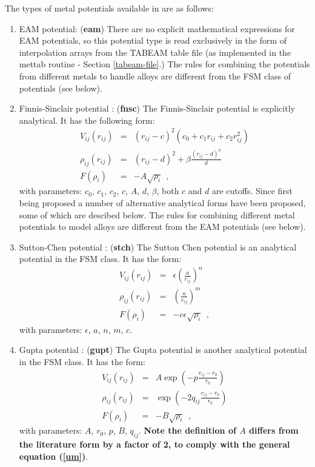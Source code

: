 The types of metal potentials available in \D{} are as follows:
\begin{enumerate}
\item EAM potential:  ({\bf eam})
There 
are no explicit mathematical expressions for EAM potentials, so
this potential type is read exclusively in the form of interpolation
arrays from the TABEAM table file (as implemented in the {\sc
mettab} routine - Section \ref{tabeam-file}.)  The rules
for combining the potentials from different metals to handle alloys
are different from the FSM class of potentials (see below).
\item Finnis-Sinclair potential \cite{finnis-84a}:  ({\bf fnsc})
The Finnis-Sinclair 
potential is explicitly analytical.  It has the 
following form:
\begin{eqnarray}
V_{ij}(r_{ij}) &=& (r_{ij}-c)^{2} (c_{0}+c_{1}r_{ij}+c_{2}r_{ij}^{2}) \nonumber \\
\rho_{ij}(r_{ij}) &=& (r_{ij}-d)^{2} + \beta \frac{(r_{ij}-d)^{3}}{d} \\
F(\rho_{i}) &=& -A \sqrt{\rho_{i}}~~, \nonumber
\end{eqnarray}
with parameters: $c_{0}$, $c_{1}$, $c_{2}$, $c$, $A$, $d$, $\beta$,
both $c$ and $d$ are cutoffs.  Since first being proposed a number of
alternative analytical forms have been proposed, some of which are
descibed below.  The rules for combining different metal potentials to
model alloys are different from the EAM potentials (see below).
\item Sutton-Chen potential \cite{sutton-90a,rafii-tabar-91a,todd-93a}:
({\bf stch})
The Sutton Chen 
potential is an analytical potential in the FSM
class.  It has the form:
\begin{eqnarray}
V_{ij}(r_{ij}) &=& \epsilon \left( \frac{a}{r_{ij}} \right)^{n} \nonumber \\
\rho_{ij}(r_{ij}) &=& \left( \frac{a}{r_{ij}} \right)^{m} \\
F(\rho_{i}) &=& -c \epsilon \sqrt{\rho_{i}}~~, \nonumber
\end{eqnarray}
with parameters: $\epsilon$, $a$, $n$, $m$, $c$. 
\item Gupta potential \cite{cleri-93a}:  ({\bf gupt})
The Gupta potential 
is another analytical potential in the FSM
class.  It has the form:
\begin{eqnarray}
V_{ij}(r_{ij}) &=& A \exp \left(-p \frac{r_{ij}-r_{0}}{r_{0}}\right) \nonumber \\
\rho_{ij}(r_{ij}) &=& \exp \left(-2 q_{ij} \frac{r_{ij}-r_{0}}{r_{0}}\right) \\
F(\rho_{i}) &=& -B \sqrt{\rho_{i}}~~, \nonumber
\end{eqnarray}
with parameters: $A$, $r_{0}$, $p$, $B$, $q_{ij}$. {\bf Note the
definition of $A$ differs from the literature form by a factor of 2, to
comply with the general equation (\ref{um})}.
\end{enumerate}

